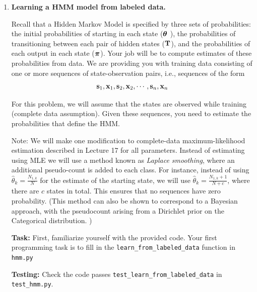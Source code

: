 \documentclass[submit]{harvardml}
\begin{document}

\pagebreak




\begin{enumerate}

\item  \textbf{Learning a HMM model from labeled data.}

Recall that a Hidden Markov Model is specified by three sets of
probabilities: the initial probabilities of starting in each state ($\boldsymbol{\theta}$ ),
the probabilities of transitioning between each pair of hidden states ($\mathbf{T}$),
and the probabilities of each output in each state ($\boldsymbol{\pi}$).  Your job will be
to compute estimates of these probabilities from data.  We are
providing you with training data consisting of one or more sequences
of state-observation pairs, i.e., sequences of the form
\[\mathbf{s}_1, \mathbf{x}_1, \mathbf{s}_2, \mathbf{x}_2, \cdots, \mathbf{s}_n, \mathbf{x}_n\]

For this problem, we will assume that the states are observed while
training (complete data assumption).  Given these sequences, you need
to estimate the probabilities that define the HMM. 

Note: We will make one modification to complete-data
maximum-likelihood estimation described in Lecture 17 for all
parameters. Instead of estimating using MLE we will use a method known
as \emph{Laplace smoothing}, where an additional pseudo-count is added
to each class. For instance, instead of using $\hat{\theta}_k =
\frac{N_{1,k}}{N}$ for the estimate of the starting state, we will use
$\hat{\theta}_k = \frac{N_{1,k}+ 1}{N + c}$, where there are $c$
states in total. This ensures that no sequences have zero probability.
(This method can also be shown to correspond to a Bayesian approach,
with the pseudocount arising from a Dirichlet prior on the Categorical
distribution. )

\textbf{Task:} First, familiarize yourself with the provided code. Your first programming
task is to fill in the {\tt learn\_from\_labeled\_data} function in
{\tt hmm.py}  

{\bf Testing:} Check the code passes {\tt test\_learn\_from\_labeled\_data} in {\tt
  test\_hmm.py}.





\end{enumerate}
\end{document}
